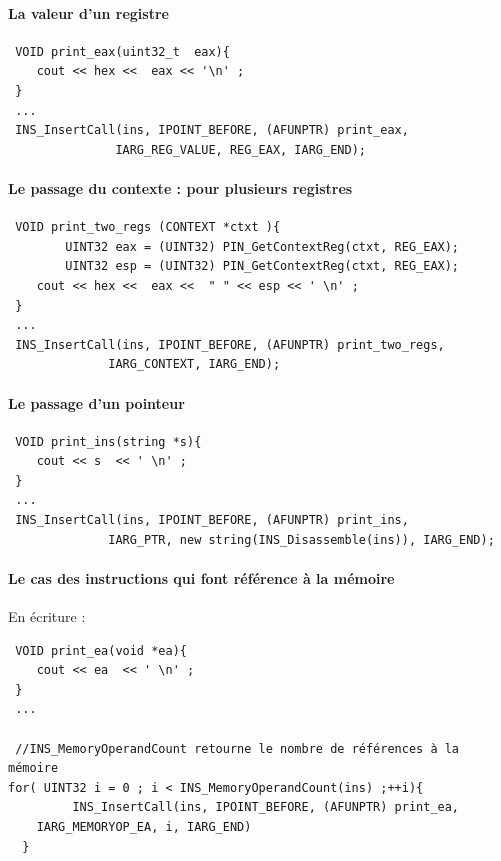 \documentclass{book}
\begin{document}
\paragraph{La valeur d'un registre}

\begin{verbatim}
 VOID print_eax(uint32_t  eax){
  	cout << hex <<  eax << '\n' ; 
 }
 ...
 INS_InsertCall(ins, IPOINT_BEFORE, (AFUNPTR) print_eax,  
               IARG_REG_VALUE, REG_EAX, IARG_END);
  \end{verbatim}
  
\paragraph{Le passage du contexte : pour plusieurs registres }

\begin{verbatim}
 VOID print_two_regs (CONTEXT *ctxt ){
        UINT32 eax = (UINT32) PIN_GetContextReg(ctxt, REG_EAX);
        UINT32 esp = (UINT32) PIN_GetContextReg(ctxt, REG_EAX);  
  	cout << hex <<  eax <<  " " << esp << ' \n' ; 
 }
 ...
 INS_InsertCall(ins, IPOINT_BEFORE, (AFUNPTR) print_two_regs,  
              IARG_CONTEXT, IARG_END);
  \end{verbatim}
  
 \paragraph{Le passage d'un pointeur}
\begin{verbatim}
 VOID print_ins(string *s){
  	cout << s  << ' \n' ; 
 }
 ...
 INS_InsertCall(ins, IPOINT_BEFORE, (AFUNPTR) print_ins,  
              IARG_PTR, new string(INS_Disassemble(ins)), IARG_END);
  \end{verbatim}

 \paragraph{Le cas des instructions qui font référence à la mémoire}
 
 En écriture : 
 
\begin{verbatim}
 VOID print_ea(void *ea){
  	cout << ea  << ' \n' ; 
 }
 ...
 
 //INS_MemoryOperandCount retourne le nombre de références à la mémoire
for( UINT32 i = 0 ; i < INS_MemoryOperandCount(ins) ;++i){
         INS_InsertCall(ins, IPOINT_BEFORE, (AFUNPTR) print_ea,  
	IARG_MEMORYOP_EA, i, IARG_END)
  }
 \end{verbatim}
 
\end{document}
